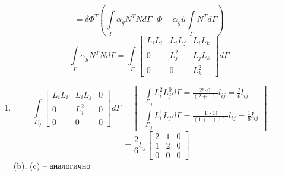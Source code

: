 \begin{enumerate}
	\[=\delta\Phi^T \left(\int \limits_{\Gamma} \alpha_g N^T N d\Gamma \cdot \Phi - \alpha_g \hat u \int \limits_{\Gamma} N^T d\Gamma \right)\]
	\[\int \limits_{\Gamma} \alpha_g N^T N d\Gamma = \int \limits_{\Gamma} \begin{bmatrix}
	L_iL_i & L_iL_j & L_iL_k\\
	0 & L_j^2 & L_jL_k\\
	0 & 0 & L_k^2
	\end{bmatrix}
	d\Gamma
	\]
	\begin{enumerate}
	\item \[\int \limits_{\Gamma_{ij}} \begin{bmatrix}
	L_iL_i & L_iL_j & 0\\
	0 & L_j^2 & 0\\
	0 & 0 & 0
	\end{bmatrix}
	d\Gamma = 
	\begin{vmatrix} \displaystyle
			\ \int\limits_{\Gamma_{ij}} L_i^2L_j^0 d\Gamma = \frac{2!\cdot 0!}{(2+1)!} l_{ij} = \frac{2}{6}l_{ij}\\
			\ \displaystyle \int\limits_{\Gamma_{ij}} L_i^1L_j^1 d\Gamma = \frac{1! \cdot 1!}{(1+1+1)!} l_{ij} = \frac{1}{6}l_{ij}
			\end{vmatrix}=\]
	\[= \frac{2}{6}l_{ij} 
	\begin{bmatrix}
	2 & 1 & 0\\
	1 & 2 & 0\\
	0 & 0 & 0
	\end{bmatrix}
	\]
	(b), (c) -- аналогично
	\end{enumerate}
	\end{enumerate}